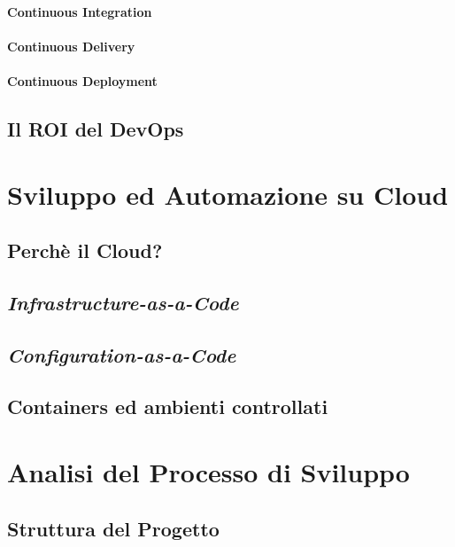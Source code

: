 \documentclass[a4paper,12pt]{report}
\begin{document}
				\subsubsection{Continuous Integration}
				
				\subsubsection{Continuous Delivery}
				
				\subsubsection{Continuous Deployment}
	
		\section{Il ROI del DevOps}
	
	\chapter{Sviluppo ed Automazione su Cloud}
	
	\section{Perchè il Cloud?}
	
	\section{\emph{Infrastructure-as-a-Code}}
	
	\section{\emph{Configuration-as-a-Code}}
	
	\section{Containers ed ambienti controllati}
	
	\chapter{Analisi del Processo di Sviluppo}
	
	\section{Struttura del Progetto}
	
\end{document}
